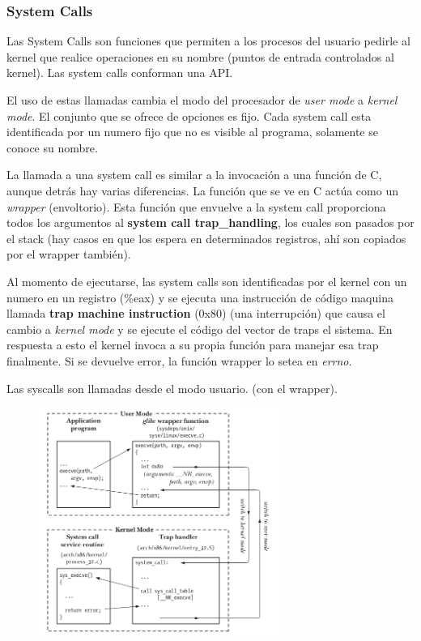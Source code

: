 \documentclass[titlepage,a4paper]{article}
\begin{document}
\subsubsection*{System Calls}

Las System Calls son funciones que permiten a los procesos del usuario pedirle al kernel que realice operaciones en su nombre (puntos de entrada controlados al kernel). Las system calls conforman una API.

El uso de estas llamadas cambia el modo del procesador de \textit{user mode} a \textit{kernel mode}. El conjunto que se ofrece de opciones es fijo. Cada system call esta identificada por un numero fijo que no es visible al programa, solamente se conoce su nombre.

La llamada a una system call es similar a la invocación a una función de C, aunque detrás hay varias diferencias. La función que se ve en C actúa como un \textit{wrapper} (envoltorio). Esta función que envuelve a la system call proporciona todos los argumentos al \textbf{system call trap\_handling}, los cuales son pasados por el stack (hay casos en que los espera en determinados registros, ahí son copiados por el wrapper también).

Al momento de ejecutarse, las system calls son identificadas por el kernel con un numero en un registro (\%eax) y se ejecuta una instrucción de código maquina llamada \textbf{trap machine instruction} (0x80) (una interrupción) que causa el cambio a \textit{kernel mode} y se ejecute el código del vector de traps el sistema. En respuesta a esto el kernel invoca a su propia función para manejar esa trap finalmente. Si se devuelve error, la función wrapper lo setea en \textit{errno}.

Las syscalls son llamadas desde el modo usuario. (con el wrapper). 

\begin{figure}[!htb]
    \centering
    \includegraphics[width=0.7\textwidth]{ImagenesApunte/system_calls.png}
\end{figure}
\end{document}
